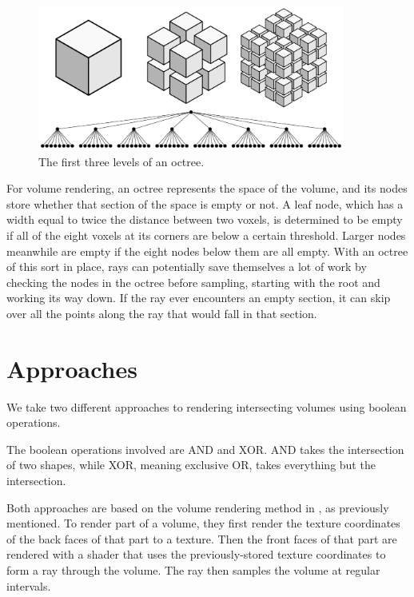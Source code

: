 \documentclass{article}
\begin{document}
\begin{figure}
\centering
\includegraphics[width=0.9\textwidth]{octree.pdf}
\caption{The first three levels of an octree.}
\label{octree}
\end{figure}

For volume rendering, an octree represents the space of the volume, and its
nodes store whether that section of the space is empty or not.  A leaf node,
which has a width equal to twice the distance between two voxels, is determined
to be empty if all of the eight voxels at its corners are below a certain
threshold.  Larger nodes meanwhile are empty if the eight nodes below them are
all empty.  With an octree of this sort in place, rays can potentially save
themselves a lot of work by checking the nodes in the octree before sampling,
starting with the root and working its way down.  If the ray ever encounters an
empty section, it can skip over all the points along the ray that would fall in
that section.

\section{Approaches}

We take two different approaches to rendering intersecting volumes using boolean
operations.

The boolean operations involved are AND and XOR.  AND takes the intersection of
two shapes, while XOR, meaning exclusive OR, takes everything but the
intersection.

Both approaches are based on the volume rendering method in \cite{Kruger03}, as
previously mentioned.  To render part of a volume, they first render the texture
coordinates of the back faces of that part to a texture.  Then the front faces
of that part are rendered with a shader that uses the previously-stored texture
coordinates to form a ray through the volume.  The ray then samples the volume
at regular intervals.
\end{document}
